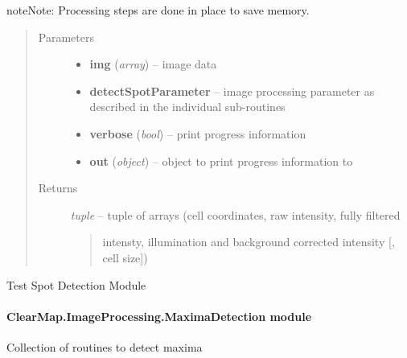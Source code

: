 \documentclass[letterpaper,10pt,english]{sphinxmanual}
\begin{document}
\begin{fulllineitems}
\begin{description}
\begin{itemize}
\end{itemize}

\end{description}

\begin{notice}{note}{Note:}
Processing steps are done in place to save memory.
\end{notice}
\begin{quote}\begin{description}
\item[{Parameters}] \leavevmode\begin{itemize}
\item {} 
\textbf{img} (\emph{array}) --
image data

\item {} 
\textbf{detectSpotParameter} --
image processing parameter as described in the individual sub-routines

\item {} 
\textbf{verbose} (\emph{bool}) --
print progress information

\item {} 
\textbf{out} (\emph{object}) --
object to print progress information to

\end{itemize}

\item[{Returns}] \leavevmode

\emph{tuple} --
tuple of arrays (cell coordinates, raw intensity, fully filtered
\begin{quote}

intensty, illumination and background corrected intensity {[}, cell size{]})
\end{quote}


\end{description}\end{quote}

\end{fulllineitems}


\begin{fulllineitems}
\label{api/ClearMap.ImageProcessing:ClearMap.ImageProcessing.SpotDetection.test}
Test Spot Detection Module

\end{fulllineitems}



\paragraph{ClearMap.ImageProcessing.MaximaDetection module}
\label{api/ClearMap.ImageProcessing:module-ClearMap.ImageProcessing.MaximaDetection}\label{api/ClearMap.ImageProcessing:clearmap-imageprocessing-maximadetection-module}
Collection of routines to detect maxima
\end{document}
